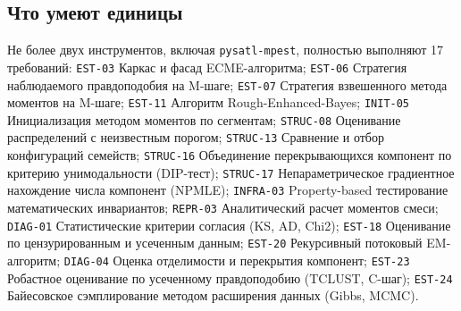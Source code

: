 \documentclass[10pt,a4paper]{article}
\begin{document}
\subsection{Что умеют единицы}
Не более двух инструментов, включая \texttt{pysatl-mpest}, полностью выполняют 17 требований: \texttt{EST-03} Каркас и фасад ECME-алгоритма; \texttt{EST-06} Стратегия наблюдаемого правдоподобия на M-шаге; \texttt{EST-07} Стратегия взвешенного метода моментов на M-шаге; \texttt{EST-11} Алгоритм Rough-Enhanced-Bayes; \texttt{INIT-05} Инициализация методом моментов по сегментам; \texttt{STRUC-08} Оценивание распределений с неизвестным порогом; \texttt{STRUC-13} Сравнение и отбор конфигураций семейств; \texttt{STRUC-16} Объединение перекрывающихся компонент по критерию унимодальности (DIP-тест); \texttt{STRUC-17} Непараметрическое градиентное нахождение числа компонент (NPMLE); \texttt{INFRA-03} Property-based тестирование математических инвариантов; \texttt{REPR-03} Аналитический расчет моментов смеси; \texttt{DIAG-01} Статистические критерии согласия (KS, AD, Chi2); \texttt{EST-18} Оценивание по цензурированным и усеченным данным; \texttt{EST-20} Рекурсивный потоковый EM-алгоритм; \texttt{DIAG-04} Оценка отделимости и перекрытия компонент; \texttt{EST-23} Робастное оценивание по усеченному правдоподобию (TCLUST, C-шаг); \texttt{EST-24} Байесовское сэмплирование методом расширения данных (Gibbs, MCMC).
\end{document}
